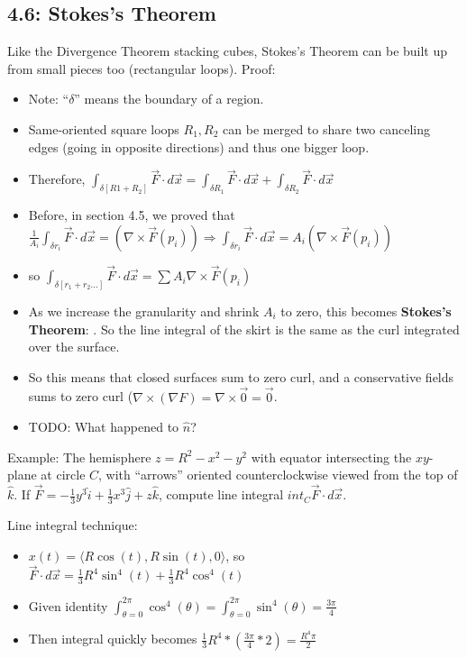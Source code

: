 \documentclass[11pt, oneside]{article}   	%
\begin{document}
\subsection{4.6: Stokes's Theorem}

Like the Divergence Theorem stacking cubes, Stokes's Theorem can be built up from small pieces too (rectangular loops). Proof:

\begin{itemize}
\item Note: ``$\delta$'' means the boundary of a region.
\item Same-oriented square loops $R_1, R_2$ can be merged to share two canceling edges (going in opposite directions) and thus one bigger loop. 
\item Therefore, $\int_{\delta [R1+R_2]} \vec{F}\cdot d\vec{x} = \int_{\delta R_1} \vec{F}\cdot d\vec{x}  + \int_{\delta R_2} \vec{F}\cdot d\vec{x} $ 
\item Before, in section 4.5, we proved that $\frac{1}{A_i} \int_{\delta r_i} \vec{F} \cdot d\vec{x} = (\nabla \times \vec{F}(p_i))\Rightarrow \int_{\delta r_i} \vec{F} \cdot d\vec{x} = A_i (\nabla \times \vec{F}(p_i))$ 
\item so $\int_{\delta [r_1 + r_2 ...]} \vec{F} \cdot d\vec{x} = \sum  A_i \nabla \times \vec{F}(p_i)$
\item As we increase the granularity and shrink $A_i$ to zero, this becomes \textbf{Stokes's Theorem}: .  So the line integral of the skirt is the same as the curl integrated over the surface.
\item So this means that closed surfaces sum to zero curl, and a conservative fields sums to zero curl ($\nabla \times (\nabla F) = \nabla \times \vec{0} = \vec{0}$.
\item TODO: What happened to $\hat{n}$?
\end{itemize}

Example: The hemisphere $z = R^2- x^2 - y^2$ with equator intersecting the $xy$-plane at circle $C$, with ``arrows'' oriented counterclockwise viewed from the top of $\hat{k}$.  If $\vec{F} = -\frac{1}{3}y^3\hat{i} + \frac{1}{3}x^3\hat{j} + z\hat{k}$, compute line integral $int_C \vec{F}\cdot d\vec{x}$.  

Line integral technique:
\begin{itemize}
\item $x(t) = \langle R\cos(t), R\sin(t), 0 \rangle$, so $\vec{F} \cdot d\vec{x} = \frac{1}{3}R^4\sin^4(t) + \frac{1}{3}R^4\cos^4(t)$
\item Given identity $\int_{\theta = 0}^{2\pi}\cos^4(\theta) = \int_{\theta = 0}^{2\pi}\sin^4(\theta) = \frac{3\pi}{4}$
\item Then integral quickly becomes $ \frac{1}{3}R^4 * ( \frac{3\pi}{4} * 2) = \frac{R^4\pi}{2}$
\end{itemize}
\end{document}

